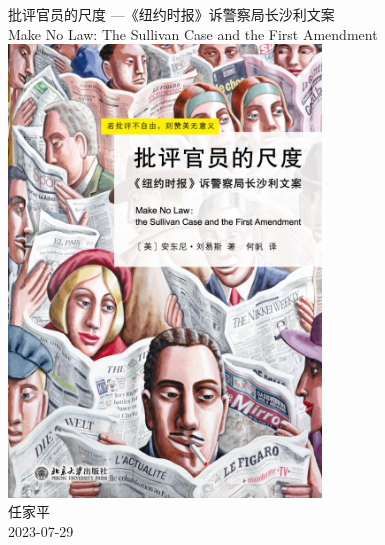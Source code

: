 \documentclass[a4paper, 12pt]{article}
\begin{document}
\begin{center}
    {\Huge 
        批评官员的尺度 ---《纽约时报》诉警察局长沙利文案}\\[12pt]
    {\huge 
        Make No Law: The Sullivan Case and the First Amendment}\\[20pt]
    
    \includegraphics[height=12cm]{figure/cover.jpg} 
    \\[20pt] 

    {\Large 
        任家平\\[12pt]
        2023-07-29}
\end{center}
\thispagestyle{empty}



\newpage
{}
\tableofcontents
\newpage
{}



\end{document}
